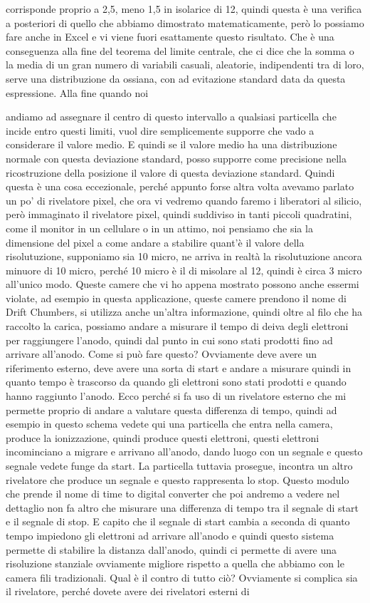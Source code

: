 {corrisponde proprio a 2,5, meno 1,5 in isolarice di 12, quindi questa è una verifica a posteriori di quello che abbiamo dimostrato matematicamente, però lo possiamo fare anche in Excel e vi viene fuori esattamente questo risultato. Che è una conseguenza alla fine del teorema del limite centrale, che ci dice che la somma o la media di un gran numero di variabili casuali, aleatorie, indipendenti tra di loro, serve una distribuzione da ossiana, con ad evitazione standard data da questa espressione. Alla fine quando noi 

andiamo ad assegnare il centro di questo intervallo a qualsiasi particella che incide entro questi limiti, vuol dire semplicemente supporre che vado a considerare il valore medio. E quindi se il valore medio ha una distribuzione normale con questa deviazione standard, posso supporre come precisione nella ricostruzione della posizione il valore di questa deviazione standard. Quindi questa è una cosa eccezionale, perché appunto forse altra volta avevamo parlato un po' di rivelatore pixel, che ora vi vedremo quando faremo i liberatori al silicio, però immaginato il rivelatore pixel, quindi suddiviso in tanti piccoli quadratini, come il monitor in un cellulare o in un attimo, noi pensiamo che sia la dimensione del pixel a come andare a stabilire quant'è il valore della risolutuzione, supponiamo sia 10 micro, ne arriva in realtà la risolutuzione ancora minuore di 10 micro, perché 10 micro è il di misolare al 12, quindi è circa 3 micro all'unico modo. Queste camere che vi ho appena mostrato possono anche essermi violate, ad esempio in questa applicazione, queste camere prendono il nome di Drift Chumbers, si utilizza anche un'altra informazione, quindi oltre al filo che ha raccolto la carica, possiamo andare a misurare il tempo di deiva degli elettroni per raggiungere l'anodo, quindi dal punto in cui sono stati prodotti fino ad arrivare all'anodo. Come si può fare questo? Ovviamente deve avere un riferimento esterno, deve avere una sorta di start e andare a misurare quindi in quanto tempo è trascorso da quando gli elettroni sono stati prodotti e quando hanno raggiunto l'anodo. Ecco perché si fa uso di un rivelatore esterno che mi permette proprio di andare a valutare questa differenza di tempo, quindi ad esempio in questo schema vedete qui una particella che entra nella camera, produce la ionizzazione, quindi produce questi elettroni, questi elettroni incominciano a migrare e arrivano all'anodo, dando luogo con un segnale e questo segnale vedete funge da start. La particella tuttavia prosegue, incontra un altro rivelatore che produce un segnale e questo rappresenta lo stop. Questo modulo che prende il nome di time to digital converter che poi andremo a vedere nel dettaglio non fa altro che misurare una differenza di tempo tra il segnale di start e il segnale di stop. E capito che il segnale di start cambia a seconda di quanto tempo impiedono gli elettroni ad arrivare all'anodo e quindi questo sistema permette di stabilire la distanza dall'anodo, quindi ci permette di avere una risoluzione stanziale ovviamente migliore rispetto a quella che abbiamo con le camera fili tradizionali. Qual è il contro di tutto ciò? Ovviamente si complica sia il rivelatore, perché dovete avere dei rivelatori esterni di }
